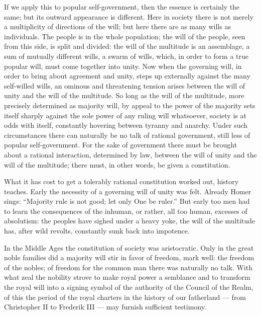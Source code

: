 \documentclass[12pt,a4paper,openany]{book}
\newcommand{\opage}[1]{\marginnote{\footnotesize\textit{[#1]}}}
\begin{document}
If we apply this to popular self-government, then
the essence is certainly the same; but its outward
appearance is different. Here in society there is
not merely a multiplicity of directions of the will; but
here there are as many wills as individuals. The people is
in the whole population; the will of the people, seen from this
side, is split and divided: the will of the multitude is an assemblage,
a sum of mutually different wills, a swarm of wills,
which, in order to form a true popular will, must
come together into unity. Now when the governing will,
in order to bring about agreement and unity, steps
up externally against the many self-willed wills,
an ominous and threatening tension arises %
between the will of unity and the will of the multitude. So
long as the will of the multitude, more precisely determined as majority will,
by appeal to the power of the majority sets itself
sharply against the sole power of any ruling will whatsoever,
society is at odds with itself, constantly
hovering between tyranny and anarchy. Under
such circumstances there can naturally be
no talk of rational government, still less of
popular self-government. For the sake of government there must
\setcounter{footnote}{0}%
\opage{22}be brought about a rational interaction, determined by law,
between the will of unity and the will of the multitude; there must, in
other words, be given a constitution.

What it has cost to get a tolerably rational
constitution worked out, history teaches. Early
the necessity of a governing will of unity was felt.
Already Homer sings: ``Majority rule is not
good; let only One be ruler.'' But early too
men had to learn the consequences of the inhuman,
or rather, all too human, excesses of absolutism:
the peoples have sighed under a heavy yoke, the will of the multitude
has, after wild revolts, constantly sunk back into impotence.


In the Middle Ages the constitution of society was aristocratic.
Only in the great noble families did a majority will stir
in favor of freedom, mark well: the
freedom of the nobles; of freedom for the common man there was
naturally no talk. With what zeal the nobility strove
to make royal power a semblance and to transform the
royal will into a signing symbol of the authority of
the Council of the Realm, of this the period of the royal charters
in the history of our fatherland --- from Christopher II to
Frederik III --- may furnish sufficient testimony.
\end{document}
